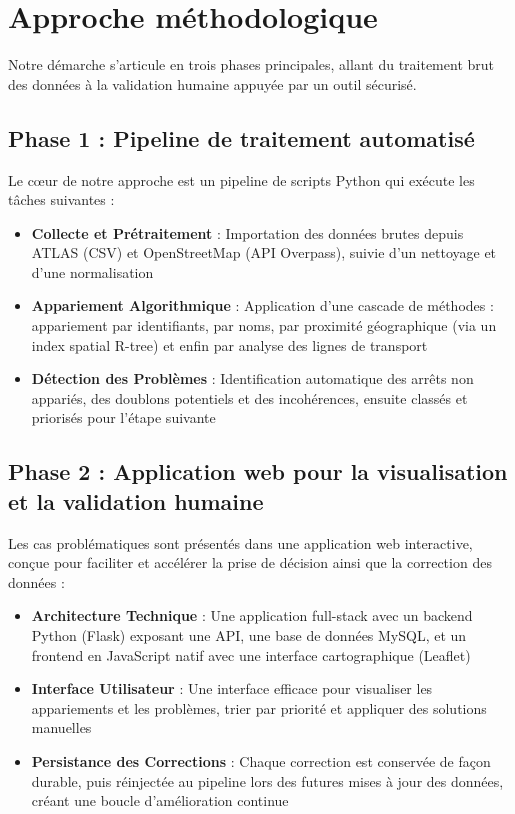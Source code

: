 \section*{Approche méthodologique}

Notre démarche s'articule en trois phases principales, allant du traitement brut des données à la validation humaine appuyée par un outil sécurisé.

\subsection*{Phase 1 : Pipeline de traitement automatisé}
Le cœur de notre approche est un pipeline de scripts Python qui exécute les tâches suivantes :
\begin{itemize}
    \item \textbf{Collecte et Prétraitement} : Importation des données brutes depuis ATLAS (CSV) et OpenStreetMap (API Overpass), suivie d'un nettoyage et d'une normalisation
    \item \textbf{Appariement Algorithmique} : Application d'une cascade de méthodes : appariement par identifiants, par noms, par proximité géographique (via un index spatial R-tree) et enfin par analyse des lignes de transport
    \item \textbf{Détection des Problèmes} : Identification automatique des arrêts non appariés, des doublons potentiels et des incohérences, ensuite classés et priorisés pour l'étape suivante
\end{itemize}

\subsection*{Phase 2 : Application web pour la visualisation et la validation humaine}
Les cas problématiques sont présentés dans une application web interactive, conçue pour faciliter et accélérer la prise de décision ainsi que la correction des données :
\begin{itemize}
    \item \textbf{Architecture Technique} : Une application full-stack avec un backend Python (Flask) exposant une API, une base de données MySQL, et un frontend en JavaScript natif avec une interface cartographique (Leaflet)
    \item \textbf{Interface Utilisateur} : Une interface efficace pour visualiser les appariements et les problèmes, trier par priorité et appliquer des solutions manuelles
    \item \textbf{Persistance des Corrections} : Chaque correction est conservée de façon durable, puis réinjectée au pipeline lors des futures mises à jour des données, créant une boucle d'amélioration continue
\end{itemize}

